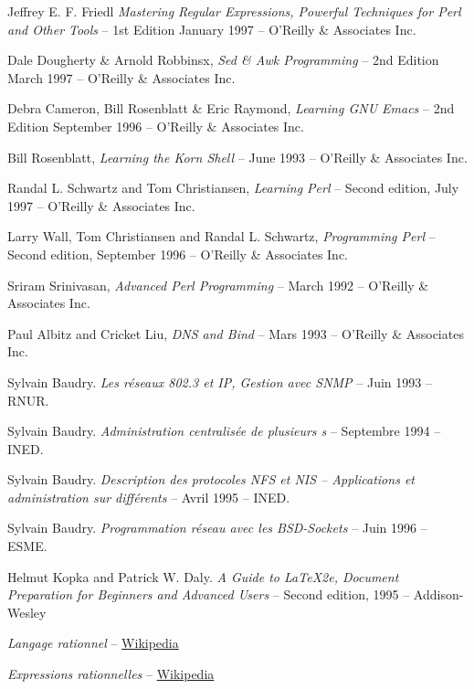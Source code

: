 \begin{thebibliography}{99}
	Jeffrey E. F. {\sc Friedl}
		\textsl{Mastering Regular Expressions,
				Powerful Techniques for Perl and Other Tools} --
		1st Edition January 1997 -- O'Reilly \& Associates Inc.

	Dale {\sc Dougherty} \& Arnold {\sc Robbinsx},
		\textsl{Sed \& Awk Programming} --
		2nd Edition March 1997 -- O'Reilly \& Associates Inc.

	Debra {\sc Cameron}, Bill {\sc Rosenblatt} \& Eric {\sc Raymond},
		\textsl{Learning GNU Emacs} --
		2nd Edition September 1996 -- O'Reilly \& Associates Inc.

	Bill {\sc Rosenblatt},
		\textsl{Learning the Korn Shell} --
		June 1993 -- O'Reilly \& Associates Inc.

	Randal L. {\sc Schwartz}  and Tom {\sc Christiansen},
		\textsl{Learning Perl} --
		Second edition, July 1997 -- O'Reilly \& Associates Inc.

	Larry {\sc Wall}, Tom {\sc Christiansen} and Randal L. {\sc Schwartz},
		\textsl{Programming Perl} --
		Second edition, September 1996 -- O'Reilly \& Associates Inc.

	Sriram {\sc Srinivasan},
		\textsl{Advanced Perl Programming} --
		March 1992 -- O'Reilly \& Associates Inc.

	Paul {\sc Albitz} and Cricket {\sc Liu},
		\textsl{DNS and Bind} --
		Mars 1993 -- O'Reilly \& Associates Inc.

	Sylvain {\sc Baudry}.
		\textsl{Les r{\'e}seaux 802.3 et IP, Gestion avec SNMP} --
		Juin 1993 -- RNUR.

	Sylvain {\sc Baudry}.
		\textsl{Administration centralis{\'e}e de plusieurs {\Unix}s} --
		Septembre 1994 -- INED.

	Sylvain {\sc Baudry}.
		\textsl{Description des protocoles NFS et NIS -- Applications et
			administration sur diff{\'e}rents {\Unix}} --
		Avril 1995 -- INED.

	Sylvain {\sc Baudry}.
		\textsl{Programmation r{\'e}seau avec les BSD-Sockets} --
		Juin 1996 -- ESME.

	Helmut {\sc Kopka} and Patrick W. {\sc Daly}.
		\textsl{A Guide to \LaTeX2e{}, Document Preparation for Beginners and Advanced Users} --
		Second edition, 1995 -- Addison-Wesley

	\textsl{Langage rationnel} --
		\href{http://fr.wikipedia.org/wiki/Langage_rationnel}{Wikipedia}

	\textsl{Expressions rationnelles} -- 
		\href{http://fr.wikipedia.org/wiki/Expression_rationnelle}{Wikipedia}

\end{thebibliography}
